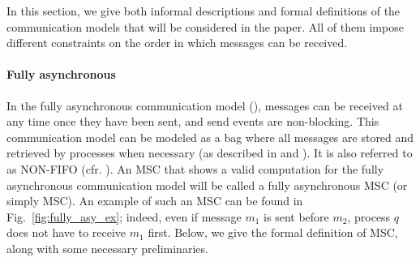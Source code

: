 
In this section, we give both informal descriptions and formal definitions of the communication models that will be considered in the paper. All of them impose different constraints on the order in which messages can be received.

%

\paragraph{\bf Fully asynchronous}
In the fully asynchronous communication model (\asy), messages can be received at any time once they have been sent, and send events are non-blocking.
This communication model can be modeled as a bag where all messages are stored and retrieved by processes when necessary (as described in \cite{DBLP:journals/fac/ChevrouHQ16} and \cite{DBLP:journals/tcs/BasuB16}).
It is also referred to as NON-FIFO (cfr.  \cite{DBLP:journals/dc/Charron-BostMT96}).
An MSC that shows a valid computation for the fully asynchronous communication model will be called a fully asynchronous MSC (or simply MSC). An example of such an MSC can be found in Fig.~\ref{fig:fully_asy_ex}; indeed, even if message $m_1$ is sent before $m_2$, process $q$ does not have to receive $m_1$ first. Below, we give the formal definition of MSC, along with some necessary preliminaries.


